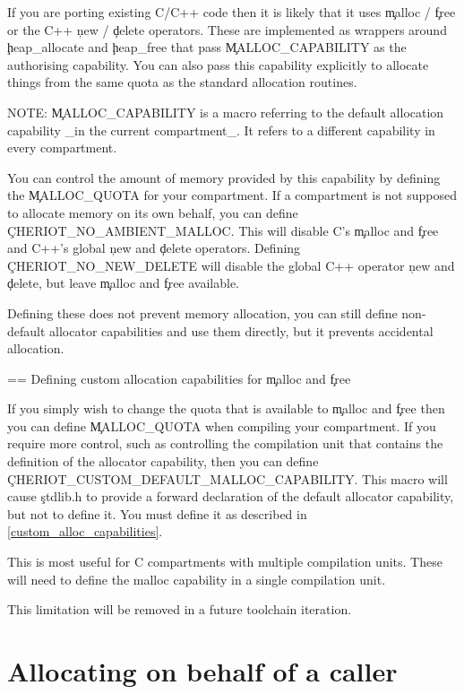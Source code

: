 If you are porting existing C/C++ code then it is likely that it uses \c{malloc} / \c{free} or the C++ \c{new} / \c{delete} operators.
These are implemented as wrappers around \c{heap_allocate} and \c{heap_free} that pass \c{MALLOC_CAPABILITY} as the authorising capability.
You can also pass this capability explicitly to allocate things from the same quota as the standard allocation routines.

NOTE: \c{MALLOC_CAPABILITY} is a macro referring to the default allocation capability _in the current compartment_.
It refers to a different capability in every compartment.

You can control the amount of memory provided by this capability by defining the \c{MALLOC_QUOTA} for your compartment.
If a compartment is not supposed to allocate memory on its own behalf, you can define \c{CHERIOT_NO_AMBIENT_MALLOC}.
This will disable C's \c{malloc} and \c{free} and C++'s global \c{new} and \c{delete} operators.
Defining \c{CHERIOT_NO_NEW_DELETE} will disable the global C++ operator \c{new} and \c{delete}, but leave \c{malloc} and \c{free} available.

Defining these does not prevent memory allocation, you can still define non-default allocator capabilities and use them directly, but it prevents accidental allocation.

== Defining custom allocation capabilities for \c{malloc} and \c{free}

If you simply wish to change the quota that is available to \c{malloc} and \c{free} then you can define \c{MALLOC_QUOTA} when compiling your compartment.
If you require more control, such as controlling the compilation unit that contains the definition of the allocator capability, then you can define \c{CHERIOT_CUSTOM_DEFAULT_MALLOC_CAPABILITY}.
This macro will cause \c{stdlib.h} to provide a forward declaration of the default allocator capability, but not to define it.
You must define it as described in \ref{custom_alloc_capabilities}.

This is most useful for C compartments with multiple compilation units.
These will need to define the malloc capability in a single compilation unit.

\begin{note}
This limitation will be removed in a future toolchain iteration.
\end{note}

\section[label=token_apis]{Allocating on behalf of a caller}

